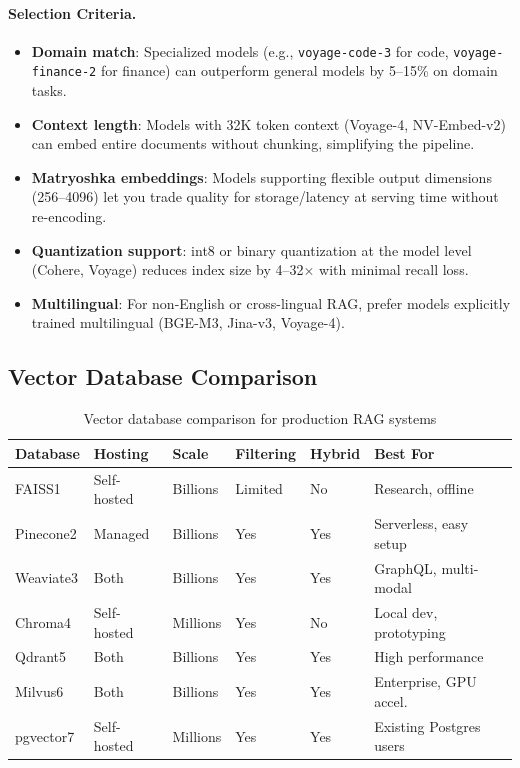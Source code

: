 \paragraph{Selection Criteria.}
\label{selection-criteria.}

\begin{itemize}
  \item \textbf{Domain match}: Specialized models (e.g., \texttt{voyage-code-3} for code, \texttt{voyage-finance-2} for finance) can outperform general models by 5--15\% on domain tasks.
  \item \textbf{Context length}: Models with 32K token context (Voyage-4, NV-Embed-v2) can embed entire documents without chunking, simplifying the pipeline.
  \item \textbf{Matryoshka embeddings}: Models supporting flexible output dimensions (256--4096) let you trade quality for storage/latency at serving time without re-encoding.
  \item \textbf{Quantization support}: int8 or binary quantization at the model level (Cohere, Voyage) reduces index size by 4--32$\times$ with minimal recall loss.
  \item \textbf{Multilingual}: For non-English or cross-lingual RAG, prefer models explicitly trained multilingual (BGE-M3, Jina-v3, Voyage-4).
\end{itemize}

\subsection{Vector Database Comparison}
\label{vector-database-comparison}

\begin{table}[ht!]
\centering
\caption{Vector database comparison for production RAG systems}
{\footnotesize
\begin{tabular}{@{}llllll@{}}
\toprule
\textbf{Database} & \textbf{Hosting} & \textbf{Scale} & \textbf{Filtering} & \textbf{Hybrid} & \textbf{Best For} \\
\midrule
FAISS1 & Self-hosted & Billions & Limited & No & Research, offline \\
Pinecone2 & Managed & Billions & Yes & Yes & Serverless, easy setup \\
Weaviate3 & Both & Billions & Yes & Yes & GraphQL, multi-modal \\
Chroma4 & Self-hosted & Millions & Yes & No & Local dev, prototyping \\
Qdrant5 & Both & Billions & Yes & Yes & High performance \\
Milvus6 & Both & Billions & Yes & Yes & Enterprise, GPU accel. \\
pgvector7 & Self-hosted & Millions & Yes & Yes & Existing Postgres users \\
\bottomrule
\end{tabular}
}
\end{table}

